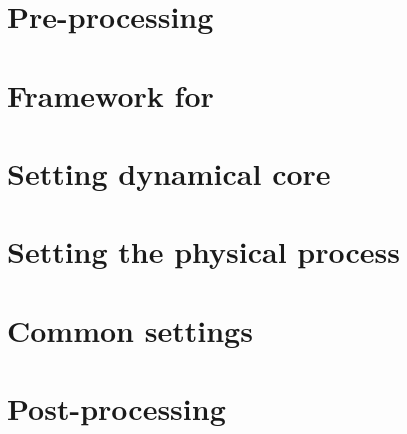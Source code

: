 \documentclass[a4paper]{report}
\begin{document}
\chapter{Pre-processing}
 
 
%  

 \chapter{Framework for \scaledg}
%  
%  
 
%  
 
 
%  
%  
%  
%  
%  


% 

\chapter{Setting dynamical core}


 \chapter{Setting the physical process} \label{sec:basic_usel_physics}
%  
%  
%  
%  
%  
%  
%  
%  
%  

 \chapter{Common settings}
%  
%  
%  

 \chapter{Post-processing} \label{sec:basic_usel_post}
 
\end{document}
